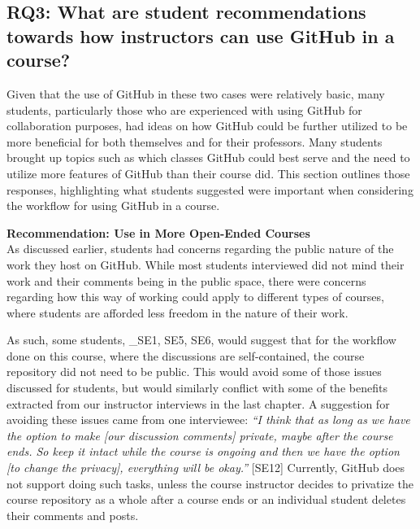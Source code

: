 \subsection{RQ3: What are student recommendations towards how instructors can use GitHub in a course?}

Given that the use of GitHub in these two cases were relatively basic, many students, particularly those who are experienced with using GitHub for collaboration purposes, had ideas on how GitHub could be further utilized to be more beneficial for both themselves and for their professors. Many students brought up topics such as which classes GitHub could best serve and the need to utilize more features of GitHub than their course did. This section outlines those responses, highlighting what students suggested were important when considering the workflow for using GitHub in a course.

\textbf{Recommendation: Use in More Open-Ended Courses} \\
As discussed earlier, students had concerns regarding the public nature of the work they host on GitHub. While most students interviewed did not mind their work and their comments being in the public space, there were concerns regarding how this way of working could apply to different types of courses, where students are afforded less freedom in the nature of their work. %

As such, some students, _{SE1, SE5, SE6}, would suggest that for the workflow done on this course, where the discussions are self-contained, the course repository did not need to be public. This would avoid some of those issues discussed for students, but would similarly conflict with some of the benefits extracted from our instructor interviews in the last chapter. A suggestion for avoiding these issues came from one interviewee: \textit{``I think that as long as we have the option to make [our discussion comments] private, maybe after the course ends. So keep it intact while the course is ongoing and then we have the option [to change the privacy], everything will be okay.''} [SE12] Currently, GitHub does not support doing such tasks, unless the course instructor decides to privatize the course repository as a whole after a course ends or an individual student deletes their comments and posts. %

